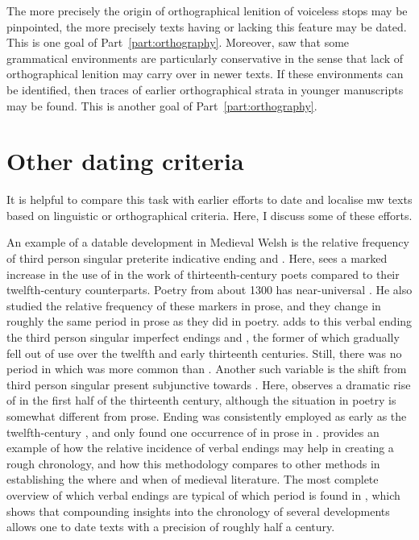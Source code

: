 The more precisely the origin of orthographical lenition of voiceless stops may be pinpointed, the more precisely texts having or lacking this feature may be dated. This is one goal of Part~\ref{part:orthography}. Moreover, \textcite{van_development14} saw that some grammatical environments are particularly conservative in the sense that lack of orthographical lenition may carry over in newer texts. If these environments can be identified, then traces of  earlier orthographical strata in younger manuscripts may be found. This is another goal of Part~\ref{part:orthography}.

\section{Other dating criteria}
\label{sec:other-dating-crit}

It is helpful to compare this task with earlier efforts to date and localise \gls{mw} texts based on linguistic or orthographical criteria. Here, I discuss some of these efforts.

An example of a datable development in Medieval Welsh is the relative frequency of third person singular preterite indicative ending  and . Here, \textcite{Rod_Datable98} sees a marked increase in the use of  in the work of thirteenth-century poets compared to their twelfth-century counterparts. Poetry from about 1300 has near-universal . He also studied the relative frequency of these markers in prose, and they change in roughly the same period in prose as they did in poetry. \Textcite[68--71]{Rod_Two03} adds to this verbal ending the third person singular imperfect endings  and \ei, the former of which gradually fell out of use over the twelfth and early thirteenth centuries. Still, there was no period in which  was more common than \ei. Another such variable is the shift from third person singular present subjunctive  towards . Here, \textcite[71--73]{Rod_Two03} observes a dramatic rise of  in the first half of the thirteenth century, although the situation in poetry is somewhat different from prose. Ending  was consistently employed as early as the twelfth-century , and \textcite[73]{Rod_Two03} only found one occurrence of  in prose in . \Textcite{Rod_Where07} provides an example of how the relative incidence of verbal endings may help in creating a rough chronology, and how this methodology compares to other methods in establishing the where and when of medieval literature. The most complete overview of which verbal endings are typical of which period is found in \textcite[166]{rodway_dating_2013}, which shows that compounding insights into the chronology of several developments allows one to date texts with a precision of roughly half a century.

